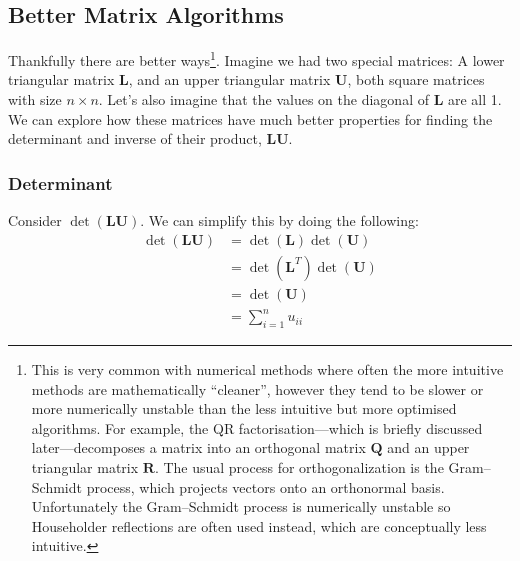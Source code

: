 \documentclass[12pt]{article}
\begin{document}
\subsection{Better Matrix Algorithms}
\label{lu}

Thankfully there are better ways\footnote{This is very common with numerical methods where often the more intuitive methods are mathematically ``cleaner'', however they tend to be slower or more numerically unstable than the less intuitive but more optimised algorithms. For example, the QR factorisation---which is briefly discussed later---decomposes a matrix into an orthogonal matrix $\mathbf{Q}$ and an upper triangular matrix $\mathbf{R}$. The usual process for orthogonalization is the Gram–Schmidt process, which projects vectors onto an orthonormal basis. Unfortunately the Gram–Schmidt process is numerically unstable so Householder reflections are often used instead, which are conceptually less intuitive.}. Imagine we had two special matrices: A lower triangular matrix $\mathbf{L}$, and an upper triangular matrix $\mathbf{U}$, both square matrices with size $n \times n$. Let's also imagine that the values on the diagonal of $\mathbf{L}$ are all 1. We can explore how these matrices have much better properties for finding the determinant and inverse of their product, $\mathbf{LU}$.

\subsubsection{Determinant}
Consider $\det(\mathbf{LU})$. We can simplify this by doing the following:
\begin{align}
	\det(\mathbf{LU}) &= \det(\mathbf{L}) \det(\mathbf{U}) \label{lu_det_1} \\
	&= \det(\mathbf{L}^T) \det(\mathbf{U}) \label{lu_det_2} \\
	&= \det(\mathbf{U}) \label{lu_det_3} \\
	&= \sum_{i=1}^{n} u_{ii} \label{lu_det_4}
\end{align}
\end{document}
